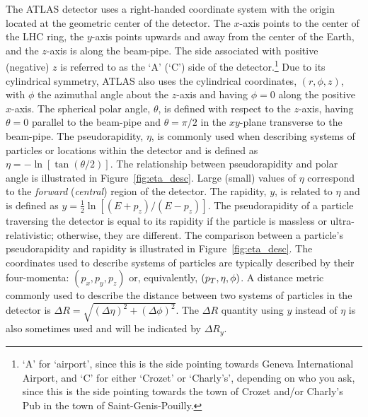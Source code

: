 The ATLAS detector uses a right-handed coordinate system with the origin located at
the geometric center of the detector.
The $x$-axis points to the center of the LHC ring, the $y$-axis points upwards
and away from the center of the Earth, and the $z$-axis is along the beam-pipe.
The side associated with positive (negative) $z$
is referred to as the `A' (`C') side of the detector.\footnote{`A' for `airport',
since this is the side pointing towards Geneva International Airport, and
`C' for either `Crozet' or `Charly's', depending on who you ask, since this is the side
pointing towards the town of Crozet and/or Charly's Pub in the town of Saint-Genis-Pouilly.}
Due to its cylindrical symmetry, ATLAS also uses the cylindrical coordinates, $(r,\phi, z)$,
with $\phi$ the azimuthal angle about the $z$-axis and having $\phi = 0$ along the positive $x$-axis.
The spherical polar angle, $\theta$, is defined with respect to the $z$-axis, having
$\theta = 0$ parallel to the beam-pipe and $\theta = \pi/2$ in the $xy$-plane transverse
to the beam-pipe.
The pseudorapidity, $\eta$, is commonly used when describing systems of particles or locations within
the detector and is defined as $\eta = - \ln \left[ \tan \left( \theta / 2 \right) \right ]$.
The relationship between pseudorapidity and polar angle is illustrated in Figure~\ref{fig:eta_desc}.
Large (small) values of $\eta$ correspond to the \textit{forward} (\textit{central}) region of the detector.
The rapidity, $y$, is related to $\eta$ and is defined as $y = \frac{1}{2} \ln \left[ (E+p_z) / (E-p_z) \right]$.
The pseudorapidity of a particle traversing the detector is equal to its rapidity if
the particle is massless or ultra-relativistic; otherwise, they are different.
The comparison between a particle's pseudorapidity and rapidity is illustrated in
Figure~\ref{fig:eta_desc}.
The coordinates used to describe systems of particles are typically described by their
four-momenta: $(p_x, p_y, p_z)$ or, equivalently, $(p_{T}, \eta, \phi)$.
A distance metric commonly used to describe the distance between two systems of particles
in the detector is $\Delta R = \sqrt{ (\Delta \eta)^2 + (\Delta \phi)^2 }$. The
$\Delta R$ quantity using $y$ instead of $\eta$ is also sometimes used and will be
indicated by $\Delta R_y$.


